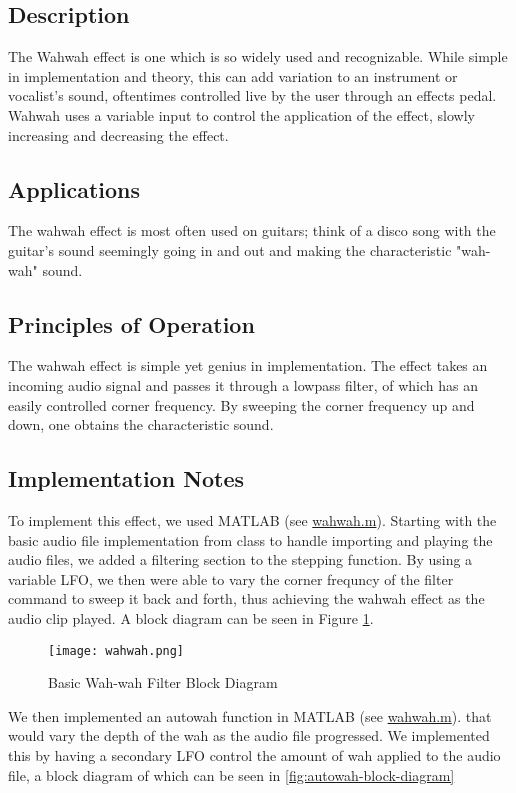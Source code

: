 \subsection{Description}
The Wahwah effect is one which is so widely used and recognizable. While simple in implementation and theory, this can add variation to an instrument or vocalist's sound, oftentimes controlled live by the user through an effects pedal. Wahwah uses a variable input to control the application of the effect, slowly increasing and decreasing the effect.

\subsection{Applications}
The wahwah effect is most often used on guitars; think of a disco song with the guitar's sound seemingly going in and out and making the characteristic "wah-wah" sound.

\subsection{Principles of Operation}
The wahwah effect is simple yet genius in implementation. The effect takes an incoming audio signal and passes it through a lowpass filter, of which has an easily controlled corner frequency. By sweeping the corner frequency up and down, one obtains the characteristic sound.

\subsection{Implementation Notes}
To implement this effect, we used MATLAB (see \href{run:../wahwah.m}{wahwah.m}). Starting with the basic audio file implementation from class to handle importing and playing the audio files, we added a filtering section to the stepping function. By using a variable LFO, we then were able to vary the corner frequncy of the filter command to sweep it back and forth, thus achieving the wahwah effect as the audio clip played. A block diagram can be seen in Figure \ref{fig:Wahwah-block-diagram}.
\begin{figure}[ht]
	\centering
	\texttt{[image: wahwah.png]}
	\caption{Basic Wah-wah Filter Block Diagram}
	\label{fig:Wahwah-block-diagram}
\end{figure}

We then implemented an autowah function in MATLAB (see \href{run:../autowah.m}{wahwah.m}). that would vary the depth of the wah as the audio file progressed. We implemented this by having a secondary LFO control the amount of wah applied to the audio file, a block diagram of which can be seen in \ref{fig:autowah-block-diagram}

